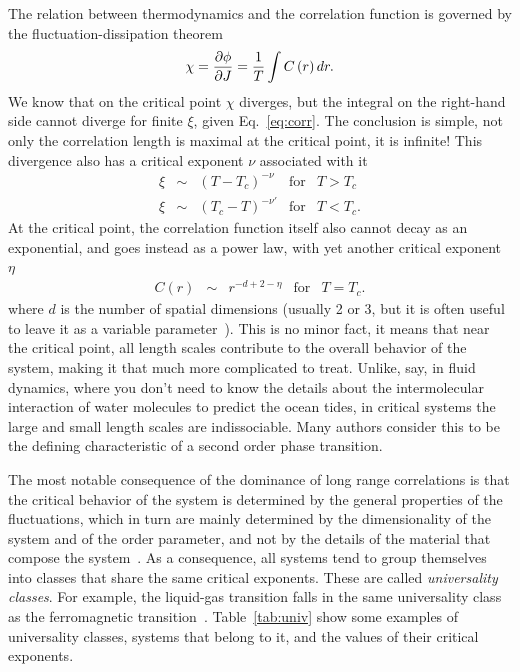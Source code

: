 The relation between thermodynamics and the correlation function is governed
by the fluctuation-dissipation theorem~\cite{Henkel2013}
\begin{equation}
    \label{eq:flucdiss}
    \chi=\frac{\partial\phi}{\partial J}=\frac{1}{T}\int C\left(r\right)dr.
\end{equation}
We know that on the critical point $\chi$ diverges, but  the integral on the
right-hand side cannot diverge for finite $\xi$, given Eq.~\ref{eq:corr}.
The conclusion is simple, not only the correlation length is maximal at the
critical point, it is infinite! This divergence also has a critical exponent
$\nu$ associated with it
\begin{equation}
    \label{eq:corlen}
    \begin{array}{ccccc}
        \xi & \sim & {\left(T-T_c\right)}^{-\nu}  & \mbox{for} & T > T_c \\
        \xi & \sim & {\left(T_c-T\right)}^{-\nu'} & \mbox{for} & T < T_c.
    \end{array}
\end{equation}
At the critical point, the correlation function itself also cannot decay as an
exponential, and goes instead as a power law, with yet another critical
exponent $\eta$
\begin{equation}
    \label{eq:critcor}
    \begin{array}{ccccc}
        C(r) & \sim & r^{-d+2-\eta} & \mbox{for} & T = T_c.
    \end{array}
\end{equation}
where $d$ is the number of spatial dimensions (usually 2 or 3, but it is often
useful to leave it as a variable parameter~\cite{Wilson1972}). This is no minor
fact, it means that near the critical point, all length scales contribute to
the overall behavior of the system, making it that much more complicated to
treat. Unlike, say, in fluid dynamics, where you don't need to know the details
about the intermolecular interaction of water molecules to predict the ocean
tides, in critical systems the large and small length scales are indissociable.
Many authors consider this to be the defining characteristic of a second order
phase transition.



The most notable consequence of the dominance of long range correlations is
that the critical behavior of the system is determined by the general
properties of the fluctuations, which in turn are mainly determined by the
dimensionality of the system and of the order parameter, and not by the details
of the material that compose the system~\cite{Stanley1999}. As a consequence,
all systems tend to group themselves into classes that share the same critical
exponents. These are called \textit{universality classes}. For example, the
liquid-gas transition falls in the same universality class as the ferromagnetic
transition~\cite{Kim1984}. Table~\ref{tab:univ} show some examples of
universality classes, systems that belong to it, and the values of their
critical exponents.


